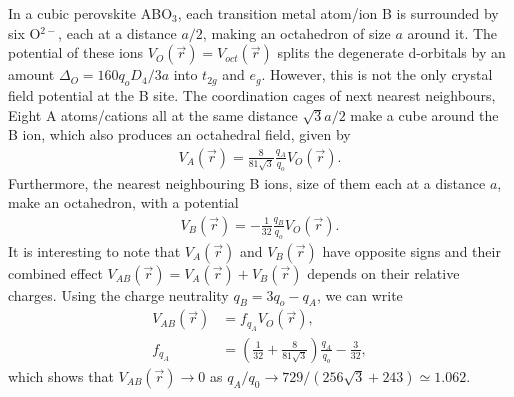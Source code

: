 \documentclass[a4paper,prb,twocolumn]{revtex4-1}  %
\begin{document}
In a cubic perovskite ABO$_3$,
each transition metal atom/ion B
is surrounded by six O$^{2-}$, each at a distance $a/2$,
 making an octahedron of size $a$ around it.
The potential of these ions $V_{O}(\vec r)= V_{oct}(\vec r)$
splits the degenerate d-orbitals
by an amount ${\Delta_O=160q_oD_{4}/3a}$
 into $t_{2g}$ and $e_g$.
However, this is not the only crystal field potential at the B site.
The coordination cages of next nearest neighbours, 
Eight A atoms/cations all at the same distance $\sqrt{3}a/2$
make a cube around the B ion,
which also produces an octahedral field, given by 
\begin{align}
V_{A}(\vec r) = \frac{8}{81 \sqrt{3}}\frac{q_A}{q_o} V_{O}(\vec r).
\end{align}
Furthermore,
the nearest neighbouring B ions, size of them each at a distance $a$,
make an octahedron, with a potential 
\begin{align}
V_{B}(\vec r) = -\frac{1}{32}\frac{q_B}{q_o}V_{O}(\vec r).
\end{align}
It is interesting to note that 
$V_{A}(\vec r)$ and $V_{B}(\vec r)$ have opposite signs
and 
their combined effect 
$V_{AB}(\vec r) = V_{A}(\vec r)+ V_{B}(\vec r)$
depends on their relative charges.
Using the charge neutrality $q_B=3q_o-q_A$,
we can write 
\begin{align}
V_{AB}(\vec r) &= f_{q_A}V_{O}(\vec r),\\
f_{q_A} &= \left(\frac{1}{32}+\frac{8}{81 \sqrt{3}}\right)\frac{q_A}{q_o} -\frac{3}{32},
\end{align}
which shows that $V_{AB}(\vec r)\to 0$
as
${q_A/q_0\to 729/({256 \sqrt{3}+243})\simeq 1.062}$.
\end{document}
